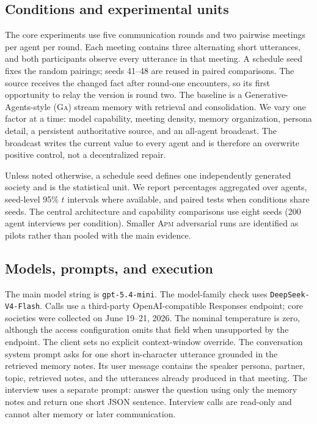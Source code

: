 \documentclass[sigconf,anonymous]{acmart}
\newcommand{\apm}{\textsc{Apm}}
\newcommand{\ga}{\textsc{Ga}}
\begin{document}
\subsection{Conditions and experimental units}

The core experiments use five communication rounds and two pairwise meetings per agent per round.
Each meeting contains three alternating short utterances, and both participants observe every
utterance in that meeting.  A schedule seed fixes the random pairings; seeds 41--48 are reused in
paired comparisons.  The source receives the changed fact after round-one encounters, so its first
opportunity to relay the version is round two.
The baseline is a Generative-Agents-style (\ga) stream memory with retrieval and consolidation.
We vary one factor at a time: model capability, meeting density, memory organization, persona
detail, a persistent authoritative source, and an all-agent broadcast.  The broadcast writes the
current value to every agent and is therefore an overwrite positive control, not a decentralized
repair.

Unless noted otherwise, a schedule seed defines one independently generated society and is the
statistical unit.  We report percentages aggregated over agents, seed-level 95\% $t$ intervals
where available, and paired tests when conditions share seeds.  The central architecture and
capability comparisons use eight seeds (200 agent interviews per condition).  Smaller \apm{}
adversarial runs are identified as pilots rather than pooled with the main evidence.

\subsection{Models, prompts, and execution}

The main model string is \nolinkurl{gpt-5.4-mini}.  The model-family check uses
\nolinkurl{DeepSeek-V4-Flash}.  Calls use a third-party OpenAI-compatible Responses endpoint;
core societies were collected on June 19--21, 2026.  The nominal temperature is zero, although
the access configuration omits that field when unsupported by the endpoint.  The client sets no
explicit context-window override.  The conversation system prompt asks for one short in-character utterance
grounded in the retrieved memory notes.  Its user message contains the speaker persona, partner,
topic, retrieved notes, and the utterances already produced in that meeting.  The interview uses
a separate prompt: answer the question using only the memory notes and return one short JSON
sentence.  Interview calls are read-only and cannot alter memory or later communication.
\end{document}
